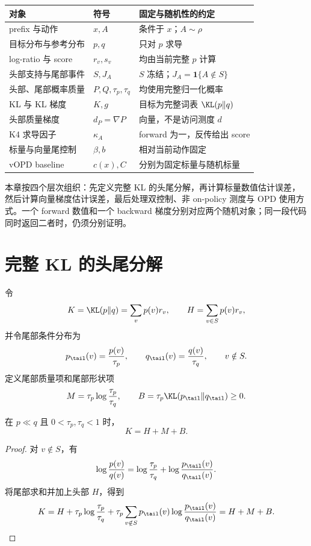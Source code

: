 \begin{center}
\begin{tabular}{lll}
\toprule
对象 & 符号 & 固定与随机性的约定\\
\midrule
prefix 与动作 & $x,A$ & 条件于 $x$；$A\sim\rho$\\
目标分布与参考分布 & $p,q$ & 只对 $p$ 求导\\
log-ratio 与 score & $r_v,s_v$ & 均由当前完整 $p$ 计算\\
头部支持与尾部事件 & $S,J_A$ & $S$ 冻结；$J_A=\mathbf1\{A\notin S\}$\\
头部、尾部概率质量 & $P,Q,\tau_p,\tau_q$ & 均使用完整归一化概率\\
KL 与 KL 梯度 & $K,g$ & 目标为完整词表 $\KL(p\Vert q)$\\
头部质量梯度 & $d_P=\nabla P$ & 向量，不是访问测度 $d$\\
K4 求导因子 & $\kappa_A$ & forward 为一，反传给出 score\\
标量与向量尾控制 & $\beta,b$ & 相对当前动作固定\\
vOPD baseline & $c(x),C$ & 分别为固定标量与随机标量\\
\bottomrule
\end{tabular}
\end{center}

本章按四个层次组织：先定义完整 KL 的头尾分解，再计算标量数值估计误差，然后计算向量梯度估计误差，最后处理双控制、非 on-policy 测度与 OPD 使用方式。一个 forward 数值和一个 backward 梯度分别对应两个随机对象；同一段代码同时返回二者时，仍须分别证明。

\section{完整 KL 的头尾分解}

令
\[
 K=\KL(p\Vert q)=\sum_vp(v)r_v,
 \qquad H=\sum_{v\in S}p(v)r_v,
 \]
并令尾部条件分布为
\[
 p_\tail(v)=\frac{p(v)}{\tau_p},\qquad
 q_\tail(v)=\frac{q(v)}{\tau_q},\qquad v\notin S.
\]
定义尾部质量项和尾部形状项
\[
 M=\tau_p\log\frac{\tau_p}{\tau_q},\qquad
 B=\tau_p\KL(p_\tail\Vert q_\tail)\geq0.
\]

\begin{theorem}[KL 链式分解]
\label{thm:chapter3-kl-chain}
在 $p\ll q$ 且 $0<\tau_p,\tau_q<1$ 时，
\begin{equation}
 K=H+M+B.
\label{eq:chapter3-kl-chain}
\end{equation}
\end{theorem}

\begin{proof}
对 $v\notin S$，有
\[
 \log\frac{p(v)}{q(v)}
 =\log\frac{\tau_p}{\tau_q}
  +\log\frac{p_\tail(v)}{q_\tail(v)}.
\]
将尾部求和并加上头部 $H$，得到
\[
 K=H+\tau_p\log\frac{\tau_p}{\tau_q}
   +\tau_p\sum_{v\notin S}p_\tail(v)
       \log\frac{p_\tail(v)}{q_\tail(v)}=H+M+B.
\]
\end{proof}


